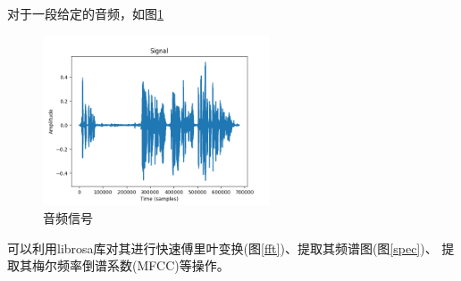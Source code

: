 \documentclass{article}
\begin{document}
对于一段给定的音频，如图\ref{signal}

\begin{figure}[H]
    \centering
    \includegraphics[width=0.6\textwidth]{figures/original-signal.png}
    \caption{音频信号}
    \label{signal}
\end{figure}

可以利用librosa库对其进行快速傅里叶变换(图\ref{fft})、提取其频谱图(图\ref{spec})、
提取其梅尔频率倒谱系数(MFCC)等操作。
\end{document}
